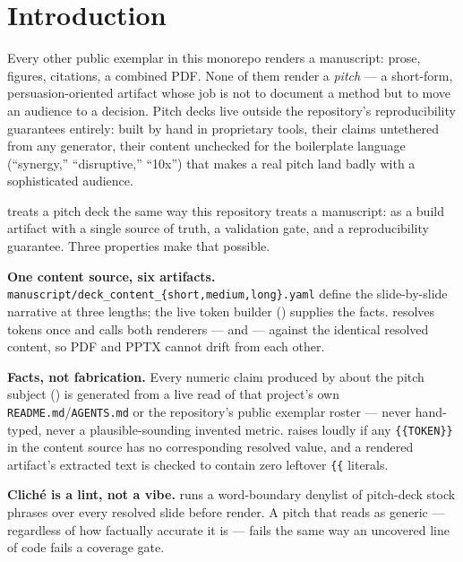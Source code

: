 \documentclass[
  english,
]{article}
\begin{document}
\newpage

\section{Introduction}\label{sec:introduction}

Every other public exemplar in this monorepo renders a manuscript:
prose, figures, citations, a combined PDF. None of them render a
\emph{pitch} --- a short-form, persuasion-oriented artifact whose job is
not to document a method but to move an audience to a decision. Pitch
decks live outside the repository's reproducibility guarantees entirely:
built by hand in proprietary tools, their claims untethered from any
generator, their content unchecked for the boilerplate language
(``synergy,'' ``disruptive,'' ``10x'') that makes a real pitch land
badly with a sophisticated audience.

 treats a pitch deck the same way this
repository treats a manuscript: as a build artifact with a single source
of truth, a validation gate, and a reproducibility guarantee. Three
properties make that possible.

\textbf{One content source, six artifacts.}
\texttt{manuscript/deck\_content\_\{short,medium,long\}.yaml} define the
slide-by-slide narrative at three lengths; the live token builder
() supplies the facts.
 resolves tokens once and calls
both renderers ---
 and
 --- against
the identical resolved content, so PDF and PPTX cannot drift from each
other.

\textbf{Facts, not fabrication.} Every numeric claim produced by
 about the pitch subject
() is generated from a live read of that
project's own \texttt{README.md}/\texttt{AGENTS.md} or the repository's
public exemplar roster --- never hand-typed, never a plausible-sounding
invented metric.  raises loudly if any
\texttt{\{\{TOKEN\}\}} in the content source has no corresponding
resolved value, and a rendered artifact's extracted text is checked to
contain zero leftover \texttt{\{\{} literals.

\textbf{Cliché is a lint, not a vibe.}  runs
a word-boundary denylist of pitch-deck stock phrases over every resolved
slide before render. A pitch that reads as generic --- regardless of how
factually accurate it is --- fails the same way an uncovered line of
code fails a coverage gate.
\end{document}
